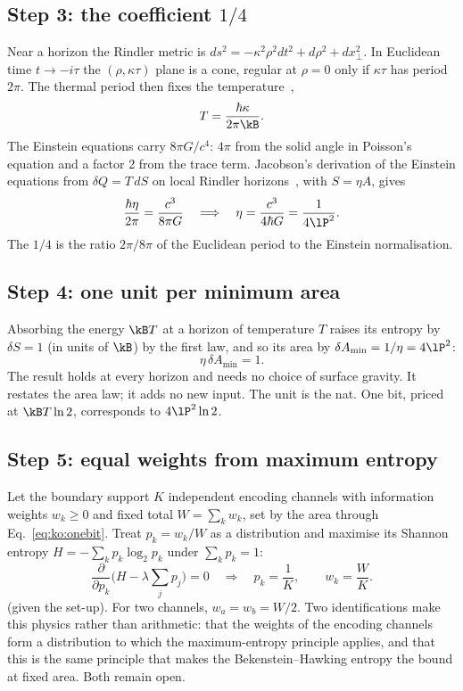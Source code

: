 \subsection{Step 3: the coefficient $1/4$}
Near a horizon the Rindler metric is $ds^2=-\kappa^2\rho^2dt^2+d\rho^2+dx_\perp^2$. In Euclidean time $t\to-i\tau$ the $(\rho,\kappa\tau)$ plane is a
cone, regular at $\rho=0$ only if $\kappa\tau$ has period $2\pi$. The thermal period then fixes the temperature~\cite{Unruh1976,BisognanoWichmann1976},
\begin{equation}
T=\frac{\hbar\kappa}{2\pi\kB}.\label{eq:ko:TU}
\end{equation}
The Einstein equations carry $8\pi G/c^4$: $4\pi$ from the solid angle in Poisson's equation and a factor 2 from the trace term. Jacobson's derivation
of the Einstein equations from $\delta Q=T\,dS$ on local Rindler horizons~\cite{Jacobson1995}, with $S=\eta A$, gives
\begin{equation}
\frac{\hbar\eta}{2\pi}=\frac{c^3}{8\pi G}\quad\Longrightarrow\quad\eta=\frac{c^3}{4\hbar G}=\frac1{4\lP^2}.\label{eq:ko:eta}
\end{equation}
\derived{} The $1/4$ is the ratio $2\pi/8\pi$ of the Euclidean period to the Einstein normalisation.

\subsection{Step 4: one unit per minimum area}
Absorbing the energy $\kB T$ at a horizon of temperature $T$ raises its entropy by $\delta S=1$ (in units of $\kB$) by the first law, and so its
area by $\delta A_{\min}=1/\eta=4\lP^2$:
\begin{equation}
\eta\,\delta A_{\min}=1.\label{eq:ko:onebit}
\end{equation}
\derived{} The result holds at every horizon and needs no choice of surface gravity. It restates the area law; it adds no new input. The unit is
the nat. One bit, priced at $\kB T\ln2$, corresponds to $4\lP^2\ln2$. \derived

\subsection{Step 5: equal weights from maximum entropy}
Let the boundary support $K$ independent encoding channels with information weights $w_k\ge0$ and fixed total $W=\sum_kw_k$, set by the area
through Eq.~\eqref{eq:ko:onebit}. Treat $p_k=w_k/W$ as a distribution and maximise its Shannon entropy $H=-\sum_kp_k\log_2p_k$ under
$\sum_kp_k=1$:
\begin{equation}
\frac{\partial}{\partial p_k}\Big(H-\lambda\sum_jp_j\Big)=0\quad\Longrightarrow\quad p_k=\frac1K,\qquad w_k=\frac WK.\label{eq:ko:maxent}
\end{equation}
\derived{} (given the set-up). For two channels, $w_a=w_b=W/2$. Two identifications make this physics rather than arithmetic: that the
weights of the encoding channels form a distribution to which the maximum-entropy principle applies, and that this is the same principle that
makes the Bekenstein--Hawking entropy the bound at fixed area. Both remain open. \conjecture

